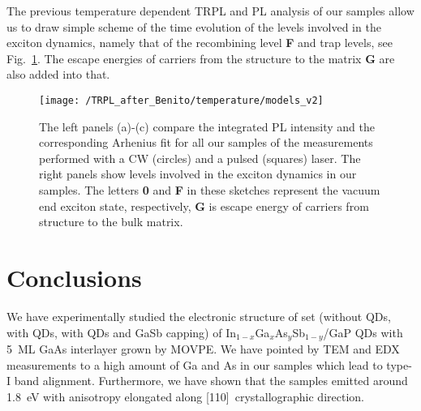 The previous temperature dependent TRPL and PL analysis of our samples allow us to draw simple scheme of the time evolution of the levels involved in the exciton dynamics, namely that of the recombining level \textbf{F} and trap levels, see Fig.~\ref{fig:Arrhenius_PLandTRPL}. The escape energies of carriers from the structure to the matrix \textbf{G} are also added into that. 




\begin{figure}
	\centering
	\texttt{[image: /TRPL\_after\_Benito/temperature/models\_v2]} %
	\caption{The left panels (a)-(c) compare the integrated PL intensity and the corresponding Arhenius fit for all our samples of the measurements performed with a CW (circles) and a pulsed (squares) laser. The right panels show levels involved in the exciton dynamics in our samples. The letters \textbf{0} and \textbf{F} in these sketches represent the vacuum end exciton state, respectively, \textbf{G} is escape energy of carriers from structure to the bulk matrix.}
	\label{fig:Arrhenius_PLandTRPL}
\end{figure}
\newpage 

\section{Conclusions}
We have experimentally studied the electronic structure of set (without QDs, with QDs, with QDs and GaSb capping) of In$_{1-x}$Ga$_{x}$As$_y$Sb$_{1-y}$/GaP QDs with 5~ML GaAs interlayer grown by MOVPE. We have pointed by TEM and EDX measurements to a high amount of Ga and As in our samples which lead to type-I band alignment. Furthermore, we have shown that the samples emitted around 1.8~eV with anisotropy elongated along [110]~crystallographic direction.   %

{\color{green}{Podívej se i zpět do textu, přibyly tam modre podbarvene texty
	
	Zmínit, že se povedlo narůst 5ML GaAs vrstvu}} {\color{red}{CO DÁL???}}